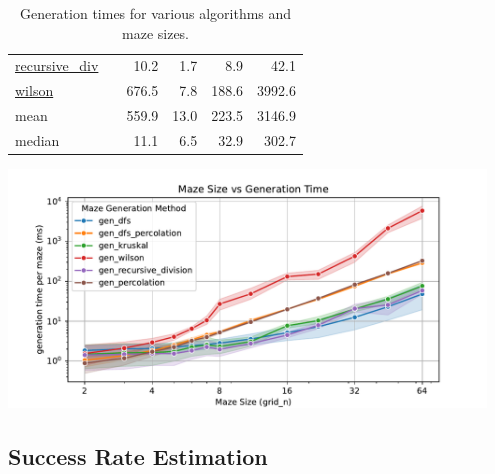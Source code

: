 \documentclass[10pt,a4paper,onecolumn]{article}
\let\origfigure\figure
\let\endorigfigure\endfigure
\renewenvironment{figure}[1][2] {
    \expandafter\origfigure\expandafter[H]
} {
    \endorigfigure
}
\begin{document}
\begin{table}[H]
\begin{tabular}{|ll|r|rrr|}
  \href{https://understanding-search.github.io/maze-dataset/maze_dataset.html\#LatticeMazeGenerators.gen_recursive_division}{recursive\_div}
          &                        &   10.2   &    1.7   &    8.9   &   42.1   \\
  \href{https://understanding-search.github.io/maze-dataset/maze_dataset.html\#LatticeMazeGenerators.gen_wilson}{wilson}
          &                        &  676.5   &    7.8   &  188.6   & 3992.6   \\
  \hline\hline
  mean
          &                        &  559.9   &   13.0   &  223.5   & 3146.9   \\
  median
          &                        &   11.1   &    6.5   &   32.9   &  302.7   \\
  \hline
\end{tabular}
\caption{Generation times for various algorithms and maze sizes.}
\label{tab:benchmarks}
\end{table}

\begin{figure}
\hypertarget{fig:benchmarks}{%
\centering
\includegraphics[width=0.95\textwidth,height=\textheight]{figures/benchmarks/gridsize-vs-gentime.pdf}
\caption{Plot of maze generation time. Generation time scales
exponentially with maze size for all algorithms. Generation time per
maze does not depend on the number of mazes being generated, and there
is minimal overhead to initializing the generation process for a small
dataset. Wilson's algorithm is notably less efficient than others and
has high variance. Note that values are averaged across all parameter
sets for that algorithm. More information can be found on the
\href{https://understanding-search.github.io/maze-dataset/benchmarks/}{benchmarks
page}.}\label{fig:benchmarks}
}
\end{figure}

\hypertarget{sec:success-rate-estimation}{%
\subsection{Success Rate Estimation}\label{sec:success-rate-estimation}}
\end{document}
